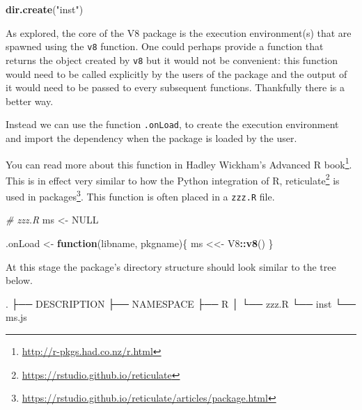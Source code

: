 \documentclass[
]{krantz}
\makeatletter
\newenvironment{Shaded}{\begin{snugshade}}{\end{snugshade}}
\newcommand{\CommentTok}[1]{\textcolor[rgb]{0.37,0.37,0.37}{\textit{#1}}}
\newcommand{\ControlFlowTok}[1]{\textcolor[rgb]{0.27,0.27,0.27}{\textbf{#1}}}
\newcommand{\ExtensionTok}[1]{#1}
\newcommand{\KeywordTok}[1]{\textcolor[rgb]{0.27,0.27,0.27}{\textbf{#1}}}
\newcommand{\NormalTok}[1]{#1}
\newcommand{\OperatorTok}[1]{\textcolor[rgb]{0.43,0.43,0.43}{\textbf{#1}}}
\newcommand{\OtherTok}[1]{\textcolor[rgb]{0.37,0.37,0.37}{#1}}
\newcommand{\StringTok}[1]{\textcolor[rgb]{0.5,0.5,0.5}{#1}}
\renewcommand{\href}[2]{#2\footnote{\url{#1}}}
\newenvironment{kframe}{%
\medskip{}
\setlength{\fboxsep}{.8em}
 \def\at@end@of@kframe{}%
 \ifinner\ifhmode%
  \def\at@end@of@kframe{\end{minipage}}%
  \begin{minipage}{\columnwidth}%
 \fi\fi%
 \def\FrameCommand##1{\hskip\@totalleftmargin \hskip-\fboxsep
 \colorbox{shadecolor}{##1}\hskip-\fboxsep
     \hskip-\linewidth \hskip-\@totalleftmargin \hskip\columnwidth}%
 \MakeFramed {\advance\hsize-\width
   \@totalleftmargin\z@ \linewidth\hsize
   \@setminipage}}%
 {\par\unskip\endMakeFramed%
 \at@end@of@kframe}
\renewenvironment{Shaded}{\begin{kframe}}{\end{kframe}}
\makeatother
\begin{document}
\begin{Shaded}
\begin{Highlighting}[]
\KeywordTok{dir.create}\NormalTok{(}\StringTok{"inst"}\NormalTok{)}
\end{Highlighting}
\end{Shaded}

As explored, the core of the V8 package is the execution environment(s) that are spawned using the \texttt{v8} function. One could perhaps provide a function that returns the object created by \texttt{v8} but it would not be convenient: this function would need to be called explicitly by the users of the package and the output of it would need to be passed to every subsequent functions. Thankfully there is a better way.

Instead we can use the function \texttt{.onLoad}, to create the execution environment and import the dependency when the package is loaded by the user.

You can read more about this function in Hadley Wickham's \href{http://r-pkgs.had.co.nz/r.html}{Advanced R book}. This is in effect very similar to how the Python integration of R, \href{https://rstudio.github.io/reticulate}{reticulate} \citep{R-reticulate} is \href{https://rstudio.github.io/reticulate/articles/package.html}{used in packages}. This function is often placed in a \texttt{zzz.R} file.

\begin{Shaded}
\begin{Highlighting}[]
\CommentTok{\# zzz.R}
\NormalTok{ms <{-}}\StringTok{ }\OtherTok{NULL}

\NormalTok{.onLoad <{-}}\StringTok{ }\ControlFlowTok{function}\NormalTok{(libname, pkgname)\{}
\NormalTok{  ms <<{-}}\StringTok{ }\NormalTok{V8}\OperatorTok{::}\KeywordTok{v8}\NormalTok{()}
\NormalTok{\}}
\end{Highlighting}
\end{Shaded}

At this stage the package's directory structure should look similar to the tree below.

\begin{Shaded}
\begin{Highlighting}[]
\ExtensionTok{.}
\NormalTok{├── }\ExtensionTok{DESCRIPTION}
\NormalTok{├── }\ExtensionTok{NAMESPACE}
\NormalTok{├── }\ExtensionTok{R}
\NormalTok{│   └── }\ExtensionTok{zzz.R}
\NormalTok{└── }\ExtensionTok{inst}
\NormalTok{    └── }\ExtensionTok{ms.js}
\end{Highlighting}
\end{Shaded}
\end{document}
